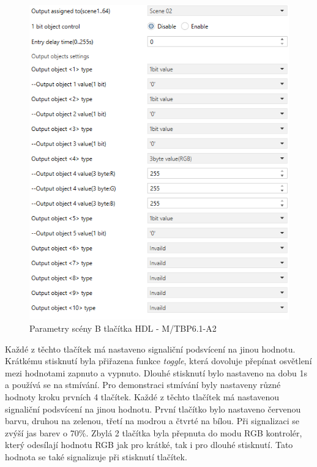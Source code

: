 \begin{figure}[!ht]
  \begin{center}
    \includegraphics[scale=0.4]{obrazky/Scena B.png}
  \end{center}
  \caption[Parametry scény B tlačítka HDL - M/TBP6.1-A2]{Parametry scény B tlačítka HDL - M/TBP6.1-A2}
  \label{fig:Parametry scény B tlačítka HDL - M/TBP6.1-A2}
\end{figure}

Každé z těchto tlačítek má nastaveno signaliční podsvícení na jinou hodnotu. Krátkému stisknutí byla přiřazena funkce \textit{toggle}, která dovoluje přepínat osvětlení mezi hodnotami zapnuto a vypnuto. Dlouhé stisknutí bylo nastaveno na dobu 1s a používá se na stmívání. Pro demonstraci stmívání byly nastaveny různé hodnoty kroku prvních 4 tlačítek. Každé z těchto tlačítek má nastavenou signaliční podsvícení na jinou hodnotu. První tlačítko bylo nastaveno červenou barvu, druhou na zelenou, třetí na modrou a čtvrté na bílou. Při signalizaci se zvýší jas barev o 70\%. Zbylá 2 tlačítka byla přepnuta do modu RGB kontrolér, který odesílají hodnotu RGB jak pro krátké, tak i pro dlouhé stisknutí. Tato hodnota se také signalizuje při stisknutí tlačítek. 

